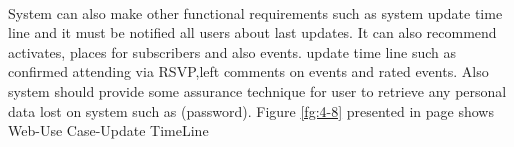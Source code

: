 \documentclass[12pt,a4paper,class,twoside,openany]{report}
\begin{document}
{\paragraph*{\hspace{.9 cm} } System can also make other functional requirements such as system update time line and it must be notified all users about last updates.
It can also recommend activates, places for subscribers and also events. update time line such as confirmed attending via RSVP,left comments on events and rated events.
Also system should provide some assurance technique for user to retrieve any personal data lost on system such as (password).
Figure \ref{fg:4-8} presented in page \pageref{fg:4-8} shows Web-Use Case-Update TimeLine
\begin{figure}
\begin{center}
\end{center}
\end{figure}}
\end{document}
